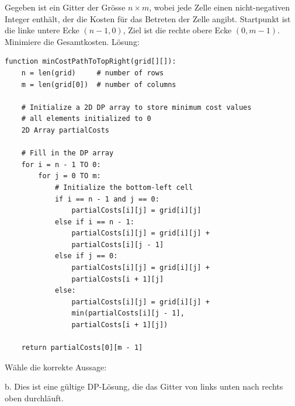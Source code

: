 \begin{contentbox}
Gegeben ist ein Gitter der Grösse $n \times m$, wobei jede Zelle einen nicht-negativen Integer enthält, der die Kosten für das Betreten der Zelle angibt. Startpunkt ist die linke untere Ecke $(n-1, 0)$, Ziel ist die rechte obere Ecke $(0, m-1)$. Minimiere die Gesamtkosten. Lösung:
\end{contentbox}
\begin{codebox}
\begin{lstlisting}[style=CodeExpert]
function minCostPathToTopRight(grid[][]):
    n = len(grid)     # number of rows
    m = len(grid[0])  # number of columns

    # Initialize a 2D DP array to store minimum cost values
    # all elements initialized to 0
    2D Array partialCosts

    # Fill in the DP array
    for i = n - 1 TO 0:
        for j = 0 TO m:
            # Initialize the bottom-left cell
            if i == n - 1 and j == 0:
                partialCosts[i][j] = grid[i][j]
            else if i == n - 1:
                partialCosts[i][j] = grid[i][j] +
                partialCosts[i][j - 1]
            else if j == 0:
                partialCosts[i][j] = grid[i][j] +
                partialCosts[i + 1][j]
            else:
                partialCosts[i][j] = grid[i][j] +
                min(partialCosts[i][j - 1],
                partialCosts[i + 1][j])

    return partialCosts[0][m - 1]
\end{lstlisting}
\end{codebox}
\begin{contentbox}
Wähle die korrekte Aussage:
\begin{factlist}
    \item b. Dies ist eine gültige DP-Lösung, die das Gitter von links unten nach rechts oben durchläuft.
\end{factlist}
\end{contentbox}

